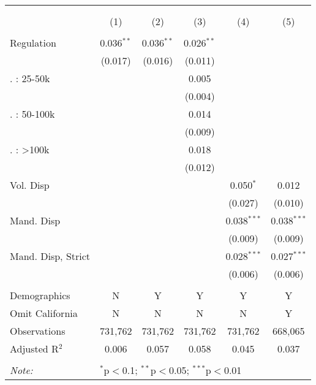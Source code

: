 
\begin{table}[!htbp] \centering 
  \caption{} 
  \label{} 
\begin{tabular}{@{\extracolsep{5pt}}lccccc} 
\\[-1.8ex]\hline 
\hline \\[-1.8ex] 
\\[-1.8ex] & (1) & (2) & (3) & (4) & (5)\\ 
\hline \\[-1.8ex] 
 Regulation & 0.036$^{**}$ & 0.036$^{**}$ & 0.026$^{**}$ &  &  \\ 
  & (0.017) & (0.016) & (0.011) &  &  \\ 
   . : 25-50k &  &  & 0.005 &  &  \\ 
  &  &  & (0.004) &  &  \\ 
   . : 50-100k &  &  & 0.014 &  &  \\ 
  &  &  & (0.009) &  &  \\ 
   . : >100k &  &  & 0.018 &  &  \\ 
  &  &  & (0.012) &  &  \\ 
  Vol. Disp &  &  &  & 0.050$^{*}$ & 0.012 \\ 
  &  &  &  & (0.027) & (0.010) \\ 
  Mand. Disp &  &  &  & 0.038$^{***}$ & 0.038$^{***}$ \\ 
  &  &  &  & (0.009) & (0.009) \\ 
  Mand. Disp, Strict &  &  &  & 0.028$^{***}$ & 0.027$^{***}$ \\ 
  &  &  &  & (0.006) & (0.006) \\ 
 \hline \\[-1.8ex] 
Demographics & N & Y & Y & Y & Y \\ 
Omit California & N & N & N & N & Y \\ 
Observations & 731,762 & 731,762 & 731,762 & 731,762 & 668,065 \\ 
Adjusted R$^{2}$ & 0.006 & 0.057 & 0.058 & 0.045 & 0.037 \\ 
\hline 
\hline \\[-1.8ex] 
\textit{Note:}  & \multicolumn{5}{l}{$^{*}$p$<$0.1; $^{**}$p$<$0.05; $^{***}$p$<$0.01} \\ 
\end{tabular} 
\end{table} 
